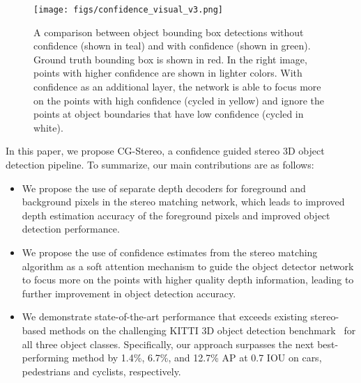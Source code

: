 \documentclass[letterpaper, 10 pt, conference]{ieeeconf}
\begin{document}
\begin{figure}[t] 
	\begin{center}
		\texttt{[image: figs/confidence\_visual\_v3.png]}
	\end{center}
		\caption{A comparison between object bounding box detections without confidence (shown in teal) and with confidence (shown in green). Ground truth bounding box is shown in red. In the right image, points with higher confidence are shown in lighter colors. With confidence as an additional layer, the network is able to focus more on the points with high confidence (cycled in yellow) and ignore the points at object boundaries that have low confidence (cycled in white).  }
		\label{fig:confidence_visual}
\end{figure}

In this paper, we propose CG-Stereo, a confidence guided stereo 3D object detection pipeline. To summarize, our main contributions are as follows:

\begin{itemize}
    \item We propose the use of separate depth decoders for foreground and background pixels in the stereo matching network, which leads to improved depth estimation accuracy of the foreground pixels and improved object detection performance.
    \item We propose the use of confidence estimates from the stereo matching algorithm as a soft attention mechanism to guide the object detector network to focus more on the points with higher quality depth information, leading to further improvement in object detection accuracy.
    \item  We demonstrate state-of-the-art performance that exceeds existing stereo-based methods on the challenging KITTI 3D object detection benchmark~\cite{geiger2012we} for all three object classes. Specifically, our approach surpasses the next best-performing method by 1.4\%, 6.7\%, and 12.7\% AP at 0.7 IOU on cars, pedestrians and cyclists, respectively.
\end{itemize}
\end{document}
